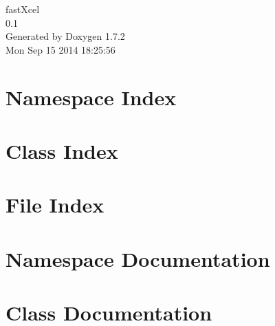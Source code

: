 \documentclass[a4paper]{book}
\begin{document}
\hypersetup{pageanchor=false}
\begin{titlepage}
\vspace*{7cm}
\begin{center}
{\Large fastXcel \\[1ex]\large 0.1 }\\
\vspace*{1cm}
{\large Generated by Doxygen 1.7.2}\\
\vspace*{0.5cm}
{\small Mon Sep 15 2014 18:25:56}\\
\end{center}
\end{titlepage}
\clearemptydoublepage
{}
\tableofcontents
\clearemptydoublepage
{}
\hypersetup{pageanchor=true}
\chapter{Namespace Index}

\chapter{Class Index}

\chapter{File Index}

\chapter{Namespace Documentation}





\chapter{Class Documentation}












\end{document}
